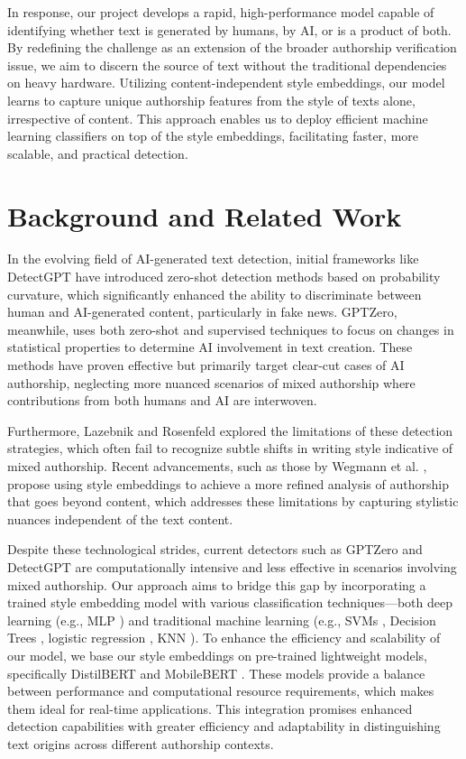 \documentclass{article}
\begin{document}
In response, our project develops a rapid, high-performance model capable of identifying whether text is generated by humans, by AI, or is a product of both. By redefining the challenge as an extension of the broader authorship verification issue, we aim to discern the source of text without the traditional dependencies on heavy hardware. Utilizing content-independent style embeddings, our model learns to capture unique authorship features from the style of texts alone, irrespective of content. This approach enables us to deploy efficient machine learning classifiers on top of the style embeddings, facilitating faster, more scalable, and practical detection.


\section{Background and Related Work}

In the evolving field of AI-generated text detection, initial frameworks like DetectGPT\cite{mitchell2023detectgpt} have introduced zero-shot detection methods based on probability curvature, which significantly enhanced the ability to discriminate between human and AI-generated content, particularly in fake news. GPTZero\cite{tian2023gptzero}, meanwhile, uses both zero-shot and supervised techniques to focus on changes in statistical properties to determine AI involvement in text creation. These methods have proven effective but primarily target clear-cut cases of AI authorship, neglecting more nuanced scenarios of mixed authorship where contributions from both humans and AI are interwoven.

Furthermore, Lazebnik and Rosenfeld \cite{lazebnik2024detecting} explored the limitations of these detection strategies, which often fail to recognize subtle shifts in writing style indicative of mixed authorship. Recent advancements, such as those by Wegmann et al. \cite{StyleEmbedding}, propose using style embeddings to achieve a more refined analysis of authorship that goes beyond content, which addresses these limitations by capturing stylistic nuances independent of the text content.

Despite these technological strides, current detectors such as GPTZero\cite{tian2023gptzero} and DetectGPT\cite{mitchell2023detectgpt} are computationally intensive and less effective in scenarios involving mixed authorship. Our approach aims to bridge this gap by incorporating a trained style embedding model with various classification techniques—both deep learning (e.g., MLP \cite{mlp}) and traditional machine learning (e.g., SVMs \cite{svm}, Decision Trees \cite{dt}, logistic regression \cite{logisticregression}, KNN \cite{knn}). To enhance the efficiency and scalability of our model, we base our style embeddings on pre-trained lightweight models, specifically DistilBERT \cite{distilbert} and MobileBERT \cite{mobilebert}. These models provide a balance between performance and computational resource requirements, which makes them ideal for real-time applications. This integration promises enhanced detection capabilities with greater efficiency and adaptability in distinguishing text origins across different authorship contexts. 
\end{document}
